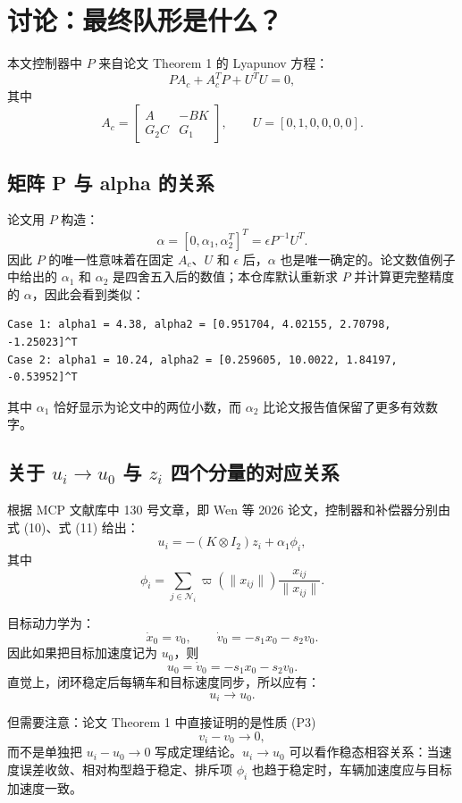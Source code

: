 
\clearpage

\section{讨论：最终队形是什么？}

本文控制器中 $P$ 来自论文 Theorem 1 的 Lyapunov 方程：
\[
P A_c + A_c^T P + U^T U = 0,
\]
其中
\[
A_c=\begin{bmatrix}A&-BK\\G_2C&G_1\end{bmatrix},\qquad
U=[0,1,0,0,0,0].
\]

\subsection{矩阵 P 与 alpha 的关系}

论文用 $P$ 构造：
\[
\alpha=[0,\alpha_1,\alpha_2^T]^T=\epsilon P^{-1}U^T.
\]
因此 $P$ 的唯一性意味着在固定 $A_c$、$U$ 和 $\epsilon$ 后，$\alpha$ 也是唯一确定的。论文数值例子中给出的 $\alpha_1$ 和 $\alpha_2$ 是四舍五入后的数值；本仓库默认重新求 $P$ 并计算更完整精度的 $\alpha$，因此会看到类似：
\begin{verbatim}
Case 1: alpha1 = 4.38, alpha2 = [0.951704, 4.02155, 2.70798, -1.25023]^T
Case 2: alpha1 = 10.24, alpha2 = [0.259605, 10.0022, 1.84197, -0.53952]^T
\end{verbatim}

其中 $\alpha_1$ 恰好显示为论文中的两位小数，而 $\alpha_2$ 比论文报告值保留了更多有效数字。

\subsection{关于 $u_i \to u_0$ 与 $z_i$ 四个分量的对应关系}

根据 MCP 文献库中 130 号文章，即 Wen 等 2026 论文，控制器和补偿器分别由式 (10)、式 (11) 给出：
\[
u_i=-(K\otimes I_2)z_i+\alpha_1\phi_i,
\]
其中
\[
\phi_i=
\sum_{j\in\mathcal N_i}\varpi(\|x_{ij}\|)
\frac{x_{ij}}{\|x_{ij}\|}.
\]

目标动力学为：
\[
\dot x_0=v_0,\qquad
\dot v_0=-s_1x_0-s_2v_0.
\]
因此如果把目标加速度记为 $u_0$，则
\[
u_0=\dot v_0=-s_1x_0-s_2v_0.
\]
直觉上，闭环稳定后每辆车和目标速度同步，所以应有：
\[
u_i \to u_0.
\]

但需要注意：论文 Theorem 1 中直接证明的是性质 (P3)
\[
v_i-v_0\to 0,
\]
而不是单独把 $u_i-u_0 \to 0$ 写成定理结论。$u_i \to u_0$ 可以看作稳态相容关系：当速度误差收敛、相对构型趋于稳定、排斥项 $\phi_i$ 也趋于稳定时，车辆加速度应与目标加速度一致。

